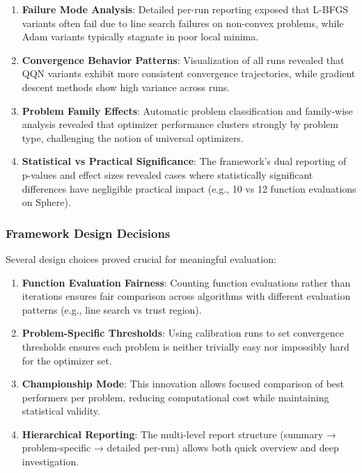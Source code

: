 \begin{enumerate}
\def\labelenumi{\arabic{enumi}.}
\tightlist
\item
  \textbf{Failure Mode Analysis}: Detailed per-run reporting exposed that L-BFGS variants often fail due to line search failures on non-convex problems, while Adam variants typically stagnate in poor local minima.
\item
  \textbf{Convergence Behavior Patterns}: Visualization of all runs revealed that QQN variants exhibit more consistent convergence trajectories, while gradient descent methods show high variance across runs.
\item
  \textbf{Problem Family Effects}: Automatic problem classification and family-wise analysis revealed that optimizer performance clusters strongly by problem type, challenging the notion of universal optimizers.
\item
  \textbf{Statistical vs Practical Significance}: The framework's dual reporting of p-values and effect sizes revealed cases where statistically significant differences have negligible practical impact (e.g., 10 vs 12 function evaluations on Sphere).
\end{enumerate}

\hypertarget{framework-design-decisions}{%
\subsubsection{Framework Design Decisions}\label{framework-design-decisions}}

Several design choices proved crucial for meaningful evaluation:

\begin{enumerate}
\def\labelenumi{\arabic{enumi}.}
\tightlist
\item
  \textbf{Function Evaluation Fairness}: Counting function evaluations rather than iterations ensures fair comparison across algorithms with different evaluation patterns (e.g., line search vs trust region).
\item
  \textbf{Problem-Specific Thresholds}: Using calibration runs to set convergence thresholds ensures each problem is neither trivially easy nor impossibly hard for the optimizer set.
\item
  \textbf{Championship Mode}: This innovation allows focused comparison of best performers per problem, reducing computational cost while maintaining statistical validity.
\item
  \textbf{Hierarchical Reporting}: The multi-level report structure (summary → problem-specific → detailed per-run) allows both quick overview and deep investigation.
\end{enumerate}

